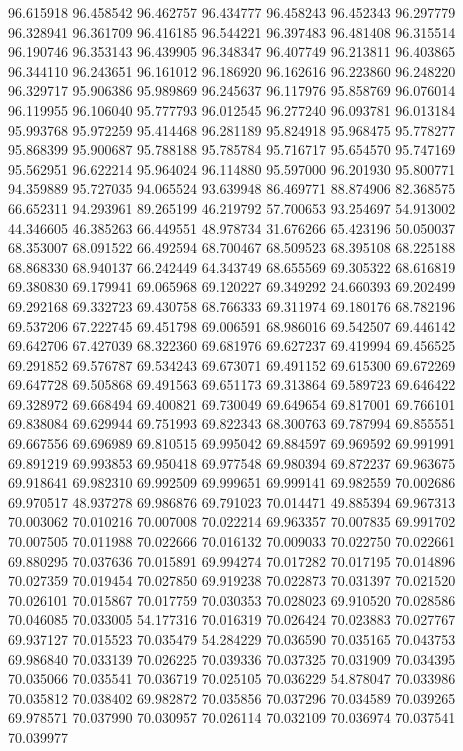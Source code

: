 96.615918
96.458542
96.462757
96.434777
96.458243
96.452343
96.297779
96.328941
96.361709
96.416185
96.544221
96.397483
96.481408
96.315514
96.190746
96.353143
96.439905
96.348347
96.407749
96.213811
96.403865
96.344110
96.243651
96.161012
96.186920
96.162616
96.223860
96.248220
96.329717
95.906386
95.989869
96.245637
96.117976
95.858769
96.076014
96.119955
96.106040
95.777793
96.012545
96.277240
96.093781
96.013184
95.993768
95.972259
95.414468
96.281189
95.824918
95.968475
95.778277
95.868399
95.900687
95.788188
95.785784
95.716717
95.654570
95.747169
95.562951
96.622214
95.964024
96.114880
95.597000
96.201930
95.800771
94.359889
95.727035
94.065524
93.639948
86.469771
88.874906
82.368575
66.652311
94.293961
89.265199
46.219792
57.700653
93.254697
54.913002
44.346605
46.385263
66.449551
48.978734
31.676266
65.423196
50.050037
68.353007
68.091522
66.492594
68.700467
68.509523
68.395108
68.225188
68.868330
68.940137
66.242449
64.343749
68.655569
69.305322
68.616819
69.380830
69.179941
69.065968
69.120227
69.349292
24.660393
69.202499
69.292168
69.332723
69.430758
68.766333
69.311974
69.180176
68.782196
69.537206
67.222745
69.451798
69.006591
68.986016
69.542507
69.446142
69.642706
67.427039
68.322360
69.681976
69.627237
69.419994
69.456525
69.291852
69.576787
69.534243
69.673071
69.491152
69.615300
69.672269
69.647728
69.505868
69.491563
69.651173
69.313864
69.589723
69.646422
69.328972
69.668494
69.400821
69.730049
69.649654
69.817001
69.766101
69.838084
69.629944
69.751993
69.822343
68.300763
69.787994
69.855551
69.667556
69.696989
69.810515
69.995042
69.884597
69.969592
69.991991
69.891219
69.993853
69.950418
69.977548
69.980394
69.872237
69.963675
69.918641
69.982310
69.992509
69.999651
69.999141
69.982559
70.002686
69.970517
48.937278
69.986876
69.791023
70.014471
49.885394
69.967313
70.003062
70.010216
70.007008
70.022214
69.963357
70.007835
69.991702
70.007505
70.011988
70.022666
70.016132
70.009033
70.022750
70.022661
69.880295
70.037636
70.015891
69.994274
70.017282
70.017195
70.014896
70.027359
70.019454
70.027850
69.919238
70.022873
70.031397
70.021520
70.026101
70.015867
70.017759
70.030353
70.028023
69.910520
70.028586
70.046085
70.033005
54.177316
70.016319
70.026424
70.023883
70.027767
69.937127
70.015523
70.035479
54.284229
70.036590
70.035165
70.043753
69.986840
70.033139
70.026225
70.039336
70.037325
70.031909
70.034395
70.035066
70.035541
70.036719
70.025105
70.036229
54.878047
70.033986
70.035812
70.038402
69.982872
70.035856
70.037296
70.034589
70.039265
69.978571
70.037990
70.030957
70.026114
70.032109
70.036974
70.037541
70.039977
